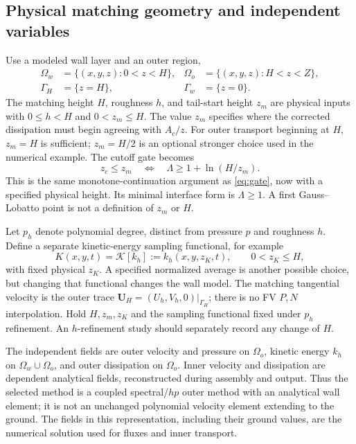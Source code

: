 \documentclass[11pt,a4paper]{article}
\numberwithin{equation}{section}
\newcommand{\Aref}{A_c}
\begin{document}
\subsection{Physical matching geometry and independent variables}
Use a modeled wall layer and an outer region,
\begin{equation}
 \begin{aligned}
 \Omega_w&=\{(x,y,z):0<z<H\},&
 \Omega_o&=\{(x,y,z):H<z<Z\},\\
 \Gamma_H&=\{z=H\},&\Gamma_w&=\{z=0\}.
 \end{aligned}
 \label{eq:hp-domains}
\end{equation}
The matching height $H$, roughness $h$, and tail-start height $z_m$ are
physical inputs with $0\leq h<H$ and $0<z_m\leq H$. The value $z_m$
specifies where the corrected dissipation must begin agreeing with
$\Aref/z$. For outer transport beginning at $H$, $z_m=H$ is sufficient;
$z_m=H/2$ is an optional stronger choice used in the numerical example.
The cutoff gate becomes
\begin{equation}
 \boxed{z_c\leq z_m
 \quad\Longleftrightarrow\quad
 \Lambda\geq1+\ln(H/z_m).}
 \label{eq:hp-gate}
\end{equation}
This is the same monotone-continuation argument as \cref{eq:gate}, now
with a specified physical height. Its minimal interface form is
$\Lambda\geq1$. A first Gauss--Lobatto point is not a definition of
$z_m$ or $H$.

Let $p_h$ denote polynomial degree, distinct from pressure $p$ and
roughness $h$. Define a separate kinetic-energy sampling functional,
for example
\begin{equation}
 K(x,y,t)=\mathcal K[k_h]:=k_h(x,y,z_K,t),\qquad
 0<z_K\leq H,
 \label{eq:K-functional}
\end{equation}
with fixed physical $z_K$. A specified normalized average is another
possible choice, but changing that functional changes the wall model.
The matching tangential velocity is the outer trace
$\bm U_H=(U_h,V_h,0)|_{\Gamma_H}$; there is no FV $P,N$ interpolation.
Hold $H,z_m,z_K$ and the sampling functional fixed under $p_h$ refinement.
An $h$-refinement study should separately record any change of $H$.

The independent fields are outer velocity and pressure on $\Omega_o$,
kinetic energy $k_h$ on $\Omega_w\cup\Omega_o$, and outer dissipation
on $\Omega_o$. Inner velocity and dissipation are dependent analytical
fields, reconstructed during assembly and output. Thus the selected
method is a coupled spectral/$hp$ outer method with an analytical wall
element; it is not an unchanged polynomial velocity element extending
to the ground. The fields in this representation, including their ground
values, are the numerical solution used for fluxes and inner transport.
\end{document}
